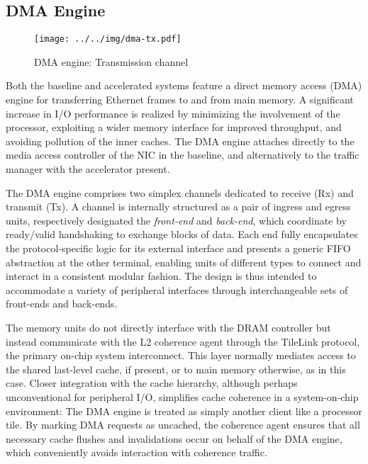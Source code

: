 \subsection{DMA Engine}
\begin{figure}[t]
\begin{center}
\texttt{[image: ../../img/dma-tx.pdf]}
\caption{DMA engine: Transmission channel}
\label{fig:dma-tx}

\end{center}
\end{figure}


Both the baseline and accelerated systems feature a direct memory access
(DMA) engine for transferring Ethernet frames to and from main memory.
A significant increase in I/O performance is realized by minimizing the
involvement of the processor, exploiting a wider memory interface for
improved throughput, and avoiding pollution of the inner caches.
The DMA engine attaches directly to the media access controller of the
NIC in the baseline, and alternatively to the traffic manager with the
accelerator present.

The DMA engine comprises two simplex channels dedicated to receive (Rx)
and transmit (Tx).
A channel is internally structured as a pair of ingress and egress
units, respectively designated the \emph{front-end} and \emph{back-end},
which coordinate by ready/valid handshaking to exchange blocks of data.
Each end fully encapsulates the protocol-specific logic for its
external interface and presents a generic FIFO abstraction at the other
terminal, enabling units of different types to connect and interact in a
consistent modular fashion.
The design is thus intended to accommodate a variety of peripheral
interfaces through interchangeable sets of front-ends and back-ends.

The memory units do not directly interface with the DRAM controller but
instead communicate with the L2 coherence agent through the TileLink
protocol, the primary on-chip system interconnect.
This layer normally mediates access to the shared last-level cache, if
present, or to main memory otherwise, as in this case.
Closer integration with the cache hierarchy, although perhaps
unconventional for peripheral I/O, simplifies cache coherence in a
system-on-chip environment:
The DMA engine is treated as simply another client like a processor
tile.
By marking DMA requests as uncached, the coherence agent ensures that
all necessary cache flushes and invalidations occur on behalf of the DMA
engine, which conveniently avoids interaction with coherence traffic.

